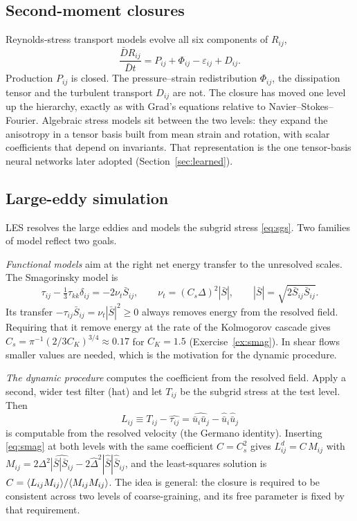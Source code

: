 \subsection{Second-moment closures}

Reynolds-stress transport models evolve all six components of $R_{ij}$,
\[
  \frac{\bar DR_{ij}}{\bar Dt}=P_{ij}+\Phi_{ij}-\varepsilon_{ij}+D_{ij} .
\]
Production $P_{ij}$ is closed. The pressure--strain redistribution
$\Phi_{ij}$, the dissipation tensor and the turbulent transport $D_{ij}$
are not. The closure has moved one level up the hierarchy, exactly as with
Grad's equations relative to Navier--Stokes--Fourier. Algebraic stress
models sit between the two levels: they expand the anisotropy in a tensor
basis built from mean strain and rotation, with scalar coefficients that
depend on invariants. That representation is the one tensor-basis neural
networks later adopted (Section~\ref{sec:learned}).

\subsection{Large-eddy simulation}

LES resolves the large eddies and models the subgrid stress \eqref{eq:sgs}.
Two families of model reflect two goals.

\emph{Functional models} aim at the right net energy transfer to the
unresolved scales. The Smagorinsky model \cite{Smagorinsky63} is
\begin{equation}
  \tau_{ij}-\tfrac13\tau_{kk}\delta_{ij}=-2\nu_t\bar S_{ij},
  \qquad
  \nu_t=(C_s\Delta)^2|\bar S|,
  \qquad |\bar S|=\sqrt{2\bar S_{ij}\bar S_{ij}} .
  \label{eq:smag}
\end{equation}
Its transfer $-\tau_{ij}\bar S_{ij}=\nu_t|\bar S|^2\ge0$ always removes
energy from the resolved field. Requiring that it remove energy at the
rate of the Kolmogorov cascade gives
$C_s=\pi^{-1}(2/3C_K)^{3/4}\approx0.17$ for $C_K=1.5$
(Exercise~\ref{ex:smag}). In shear flows smaller values are needed, which
is the motivation for the dynamic procedure.

\emph{The dynamic procedure} \cite{Germano91,Lilly92} computes the
coefficient from the resolved field. Apply a second, wider test filter
(hat) and let $T_{ij}$ be the subgrid stress at the test level. Then
\begin{equation}
  L_{ij}\equiv T_{ij}-\widehat{\tau_{ij}}
  =\widehat{\bar u_i\bar u_j}-\hat{\bar u}_i\hat{\bar u}_j
\end{equation}
is computable from the resolved velocity (the Germano identity).
Inserting \eqref{eq:smag} at both levels with the same coefficient
$C=C_s^2$ gives $L_{ij}^{d}=C\,M_{ij}$ with
$M_{ij}=2\Delta^2\widehat{|\bar S|\bar S_{ij}}
-2\hat\Delta^2|\hat{\bar S}|\hat{\bar S}_{ij}$, and the least-squares
solution is $C=\langle L_{ij}M_{ij} \rangle/\langle M_{ij}M_{ij} \rangle$. The idea is general:
the closure is required to be consistent across two levels of
coarse-graining, and its free parameter is fixed by that requirement.

